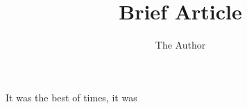 \documentclass[11pt]{amsart}
\title{Brief Article}
\author{The Author}
\begin{document}
\maketitle

It was the best of times, it was
\end{document}
